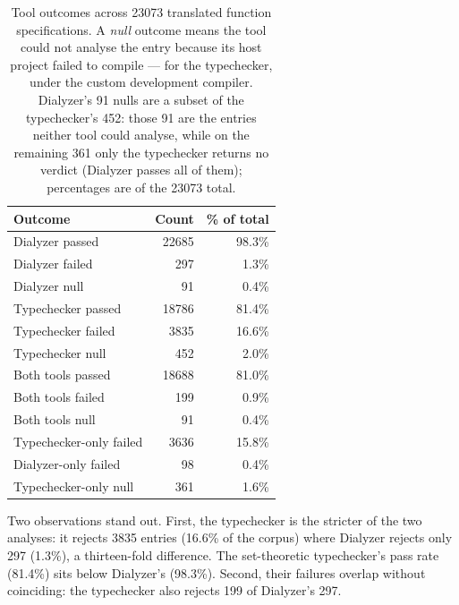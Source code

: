 \begin{table}[h]
    \centering
    \begin{tabular}{lrr}
        \toprule
        \textbf{Outcome}             & \textbf{Count} & \textbf{\% of total} \\
        \midrule
        Dialyzer passed              & \num{22685} & 98.3\% \\
        Dialyzer failed              & \num{297}   & 1.3\% \\
        Dialyzer null                & \num{91}    & 0.4\% \\
        \midrule
        Typechecker passed           & \num{18786} & 81.4\% \\
        Typechecker failed           & \num{3835}  & 16.6\% \\
        Typechecker null             & \num{452}   & 2.0\% \\
        \midrule
        Both tools passed            & \num{18688} & 81.0\% \\
        Both tools failed            & \num{199}   & 0.9\% \\
        Both tools null              & \num{91}    & 0.4\% \\
        \midrule
        Typechecker-only failed      & \num{3636}  & 15.8\% \\
        Dialyzer-only failed         & \num{98}    & 0.4\% \\
        Typechecker-only null        & \num{361}   & 1.6\% \\
        \bottomrule
    \end{tabular}
    \caption{Tool outcomes across \num{23073} translated function specifications. A \emph{null} outcome means the tool could not analyse the entry because its host project failed to compile --- for the typechecker, under the custom development compiler. Dialyzer's 91 nulls are a subset of the typechecker's 452: those 91 are the entries neither tool could analyse, while on the remaining 361 only the typechecker returns no verdict (Dialyzer passes all of them); percentages are of the \num{23073} total.}
    \label{tab:overall-results}
\end{table}

Two observations stand out.
First, the typechecker is the stricter of the two analyses: it rejects \num{3835} entries (16.6\% of the corpus) where Dialyzer rejects only 297 (1.3\%), a thirteen-fold difference.
The set-theoretic typechecker's pass rate (81.4\%) sits below Dialyzer's (98.3\%).
Second, their failures overlap without coinciding: the typechecker also rejects 199 of Dialyzer's 297.

